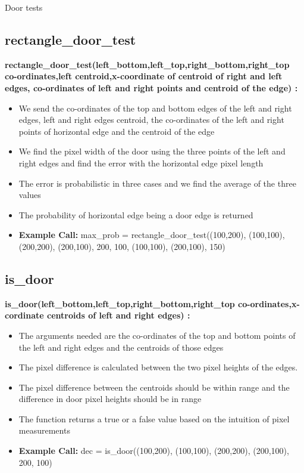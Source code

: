 \documentclass[10pt, a4paper]{beamer}
\begin{document}
\begin{frame}[allowframebreaks]{Door tests}
  \subsection{rectangle\_door\_test}
    \textbf{rectangle\_door\_test(left\_bottom,left\_top,right\_bottom,right\_top co-ordinates,left centroid,x-coordinate of centroid of right and left edges, co-ordinates of left and right points and centroid of the edge) : }
      \begin{itemize}
       \item We send the co-ordinates of the top and bottom edges of the left and right edges, left and right edges centroid, the co-ordinates of the left and right points of horizontal edge and the centroid of the edge
       \item We find the pixel width of the door using the three points of the left and right edges and find the error with the horizontal edge pixel length
       \item The error is probabilistic in three cases and we find the average of the three values
       \item The probability of horizontal edge being a door edge is returned
       \item \textbf{Example Call:} max\_prob = rectangle\_door\_test((100,200), (100,100), (200,200), (200,100), 200, 100, (100,100), (200,100), 150)
      \end{itemize}
\framebreak
  \subsection{is\_door}
    \textbf{is\_door(left\_bottom,left\_top,right\_bottom,right\_top co-ordinates,x-cordinate centroids of left and right edges) : }
      \begin{itemize}
       \item The arguments needed are the co-ordinates of the top and bottom points of the left and right edges and the centroids of those edges
       \item The pixel difference is calculated between the two pixel heights of the edges.
       \item The pixel difference between the centroids should be within range and the difference in door pixel heights should be in range
       \item The function returns a true or a false value based on the intuition of pixel measurements
       \item \textbf{Example Call:} dec = is\_door((100,200), (100,100), (200,200), (200,100), 200, 100)
      \end{itemize}
\end{frame}
\end{document}
